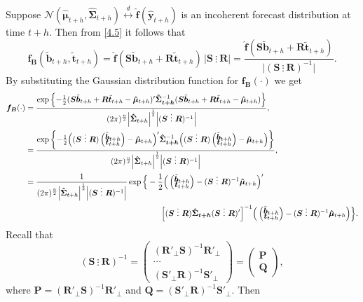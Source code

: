 \documentclass[a4paper, 11pt]{article}
\def\bt{\begin{pmatrix}\tilde{\bm{b}}_{t+h}\\[-0.2cm]\tilde{\bm{t}}_{t+h}\end{pmatrix}}
\begin{document}
Suppose $\mathscr{N}(\hat{\bm{\mu}}_{t+h}, \hat{\bm{\Sigma}}_{t+h}) \overset{d}{\leftrightarrow} \hat{\bm{f}}(\hat{\bm{y}}_{t+h})$ is an incoherent forecast distribution at time $t+h$. Then from \eqref{4.5} it follows that
\begin{equation*}
\bm{f_B}(\tilde{\bm{b}}_{t+h},\tilde{\bm{t}}_{t+h})=\hat{\bm{f}}(\bm{S}\tilde{\bm{b}}_{t+h}+\bm{R}\tilde{\bm{t}}_{t+h}) \, \Big|\bm{S} ~ \vdots~ \bm{R}\Big| = \frac{\hat{\bm{f}}(\bm{S}\tilde{\bm{b}}_{t+h}+\bm{R}\tilde{\bm{t}}_{t+h}) }{\Big|(\bm{S} ~ \vdots~ \bm{R})^{-1}\Big|}.
\end{equation*}
By substituting the Gaussian distribution function for $\bm{f_B}(\cdot)$ we get
\begin{align*}
\bm{f_B}(\cdot)
& =
\frac{\exp\left\{-\frac{1}{2}(\bm{S}\tilde{\bm{b}}_{t+h}+\bm{R}\tilde{\bm{t}}_{t+h}-\bm{\hat{\mu}}_{t+h})' \bm{\hat{\Sigma}_{t+h}}^{-1}(\bm{S}\tilde{\bm{b}}_{t+h}+\bm{R}\tilde{\bm{t}}_{t+h}-\bm{\hat{\mu}}_{t+h})\right\}}{(2\pi)^{\frac{n}{2}}\Big|\bm{\hat{\Sigma}}_{t+h}\Big|^{\frac{1}{2}}\Big|(\bm{S} ~ \vdots~ \bm{R})^{-1}\Big|},\\
& =
\frac{\exp\left\{-\frac{1}{2}\Big((\bm{S} ~ \vdots~ \bm{R})\bt-\bm{\hat{\mu}}_{t+h}\Big)' \bm{\hat{\Sigma}_{t+h}}^{-1}\Big((\bm{S} ~ \vdots~ \bm{R})\bt-\bm{\hat{\mu}}_{t+h}\Big)\right\}}{(2\pi)^{\frac{n}{2}}\Big|\bm{\hat{\Sigma}}_{t+h}\Big|^{\frac{1}{2}}\Big|(\bm{S} ~ \vdots~ \bm{R})^{-1}\Big|},\\
& =
\frac{1}{(2\pi)^{\frac{n}{2}}\Big|\bm{\hat{\Sigma}}_{t+h}\Big|^{\frac{1}{2}}\Big|(\bm{S} ~ \vdots~ \bm{R})^{-1} \Big|}
\exp \Big\{-\frac{1}{2}\Big(\bt-(\bm{S} ~ \vdots~ \bm{R})^{-1}\bm{\hat{\mu}}_{t+h}\Big)'\\
& \hspace*{6cm} \Big[(\bm{S} ~ \vdots~ \bm{R})\bm{\hat{\Sigma}_{t+h}}(\bm{S} ~ \vdots~ \bm{R})'\Big]^{-1}
\Big(\bt-(\bm{S} ~ \vdots~ \bm{R})^{-1}\bm{\hat{\mu}}_{t+h}\Big) \Big\}.
\end{align*}
Recall that
$$
(\bm{S} ~ \vdots~ \bm{R})^{-1} =
\begin{pmatrix}(\bm{R}'_\bot \bm{S})^{-1}\bm{R}'_\bot \\ \cdots \\ (\bm{S}'_\bot \bm{R})^{-1}\bm{S}'_\bot \end{pmatrix} =
\begin{pmatrix}
\bm{P} \\\bm{Q}
\end{pmatrix},
$$
where $\bm{P}=(\bm{R}'_\bot \bm{S})^{-1}\bm{R}'_\bot$ and $\bm{Q}=(\bm{S}'_\bot \bm{R})^{-1}\bm{S}'_\bot$. Then
\end{document}
